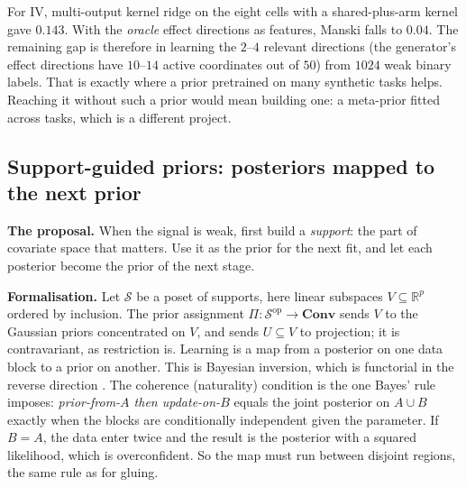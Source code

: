 \documentclass[11pt]{article}
\theoremstyle{definition}
\theoremstyle{remark}
\begin{document}
For IV, multi-output kernel ridge on the eight cells with a shared-plus-arm kernel gave $0.143$. With the \emph{oracle} effect directions as features, Manski falls to $0.04$. The remaining gap is therefore in learning the $2$--$4$ relevant directions (the generator's effect directions have $10$--$14$ active coordinates out of $50$) from $1024$ weak binary labels. That is exactly where a prior pretrained on many synthetic tasks helps. Reaching it without such a prior would mean building one: a meta-prior fitted across tasks, which is a different project.

\subsection{Support-guided priors: posteriors mapped to the next prior}\label{sec:supportprior}
\textbf{The proposal.} When the signal is weak, first build a \emph{support}: the part of covariate space that matters. Use it as the prior for the next fit, and let each posterior become the prior of the next stage.

\textbf{Formalisation.} Let $\mathcal S$ be a poset of supports, here linear subspaces $V\subseteq\mathbb R^{p}$ ordered by inclusion. The prior assignment $\Pi:\mathcal S^{\mathrm{op}}\to\mathbf{Conv}$ sends $V$ to the Gaussian priors concentrated on $V$, and sends $U\subseteq V$ to projection; it is contravariant, as restriction is. Learning is a map from a posterior on one data block to a prior on another. This is Bayesian inversion, which is functorial in the reverse direction \cite{chojacobs19,smithe20}. The coherence (naturality) condition is the one Bayes' rule imposes: \emph{prior-from-$A$ then update-on-$B$} equals the joint posterior on $A\cup B$ exactly when the blocks are conditionally independent given the parameter. If $B=A$, the data enter twice and the result is the posterior with a squared likelihood, which is overconfident. So the map must run between disjoint regions, the same rule as for gluing.
\end{document}
